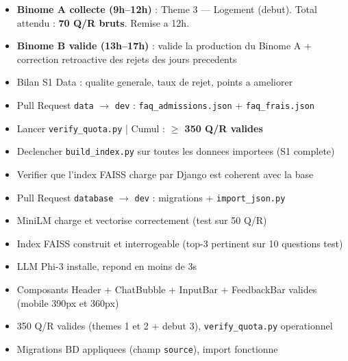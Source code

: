 \documentclass[11pt,a4paper]{article}
\renewcommand{\checkmark}{\ding{52}}
\begin{document}
\begin{databox}[Data --- J5]
\begin{itemize}
    \item[$\square$] \textbf{Binome A collecte (9h--12h)} : Theme 3 --- Logement (debut). Total attendu : \textbf{70 Q/R bruts}. Remise a 12h.
    \item[$\square$] \textbf{Binome B valide (13h--17h)} : valide la production du Binome A + correction retroactive des rejets des jours precedents
    \item[$\square$] Bilan S1 Data : qualite generale, taux de rejet, points a ameliorer
    \item[$\square$] Pull Request \texttt{data} $\rightarrow$ \texttt{dev} : \texttt{faq\_admissions.json} + \texttt{faq\_frais.json}
    \item[$\square$] Lancer \texttt{verify\_quota.py} | Cumul : \textbf{$\geq$ 350 Q/R valides}
\end{itemize}
\end{databox}

\begin{dbbox}
\begin{itemize}
    \item[$\square$] Declencher \texttt{build\_index.py} sur toutes les donnees importees (S1 complete)
    \item[$\square$] Verifier que l'index FAISS charge par Django est coherent avec la base
    \item[$\square$] Pull Request \texttt{database} $\rightarrow$ \texttt{dev} : migrations + \texttt{import\_json.py}
\end{itemize}
\end{dbbox}

\begin{phase2box}
\begin{itemize}
    \item[\checkmark] MiniLM charge et vectorise correctement (test sur 50 Q/R)
    \item[\checkmark] Index FAISS construit et interrogeable (top-3 pertinent sur 10 questions test)
    \item[\checkmark] LLM Phi-3 installe, repond en moins de 3s
    \item[\checkmark] Composants Header + ChatBubble + InputBar + FeedbackBar valides (mobile 390px et 360px)
    \item[\checkmark] 350 Q/R valides (themes 1 et 2 + debut 3), \texttt{verify\_quota.py} operationnel
    \item[\checkmark] Migrations BD appliquees (champ \texttt{source}), import fonctionne
\end{itemize}
\end{phase2box}
\end{document}
